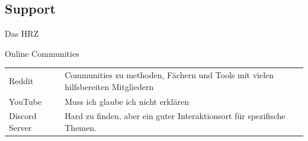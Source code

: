 \documentclass[aspectratio=169,shownotes]{beamer}
\begin{document}
\subsection{Support}
\begin{frame}{Das HRZ}
    
\end{frame}
\begin{frame}{Online Communities}
    \begin{tabularx}{\linewidth}{ll}
        Reddit & Communities zu methoden, Fächern und Tools mit vielen hilfsbereiten Mitgliedern\\
        YouTube & Muss ich glaube ich nicht erklären\\
        Discord Server & Hard zu finden, aber ein guter Interaktionsort für spezifische Themen.\\

    \end{tabularx}
\end{frame}
\end{document}
